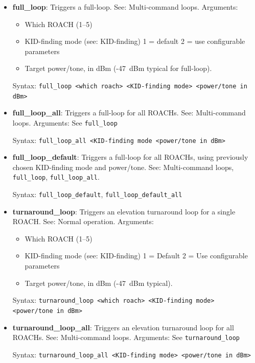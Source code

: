 \begin{itemize}[leftmargin=*,label={}]

\item \textbf{full\_loop}: Triggers a full-loop. See: Multi-command loops.
Arguments:
\begin{itemize}
  \item Which ROACH (1--5)
  \item KID-finding mode (see: KID-finding)
    1 = default
    2 = use configurable parameters
  \item Target power/tone, in dBm (-47~dBm typical for full-loop).
\end{itemize}

Syntax: \texttt{full\_loop <which roach> <KID-finding mode> <power/tone in dBm>}

\item \textbf{full\_loop\_all}: Triggers a full-loop for all ROACHs. See: Multi-command loops.
Arguments: See \texttt{full\_loop}

Syntax: \texttt{full\_loop\_all <KID-finding mode <power/tone in dBm>}

\item \textbf{full\_loop\_default}: Triggers a full-loop for all ROACHs, using previously chosen KID-finding mode and power/tone. See: Multi-command loops, \texttt{full\_loop}, \texttt{full\_loop\_all}.

Syntax: \texttt{full\_loop\_default}, \texttt{full\_loop\_default\_all}

\item \textbf{turnaround\_loop}: Triggers an elevation turnaround loop for a single ROACH\@. See: Normal operation.
Arguments:
\begin{itemize}
  \item Which ROACH (1--5)
  \item KID-finding mode (see: KID-finding)
    1 = Default
    2 = Use configurable parameters
  \item Target power/tone, in dBm (-47~dBm typical).
\end{itemize}

Syntax: \texttt{turnaround\_loop <which roach> <KID-finding mode> <power/tone in dBm>}

\item \textbf{turnaround\_loop\_all}: Triggers an elevation turnaround loop for all ROACHs. See: Multi-command loops.
Arguments: See \texttt{turnaround\_loop}

Syntax: \texttt{turnaround\_loop\_all <KID-finding mode> <power/tone in dBm>}


\end{itemize}
